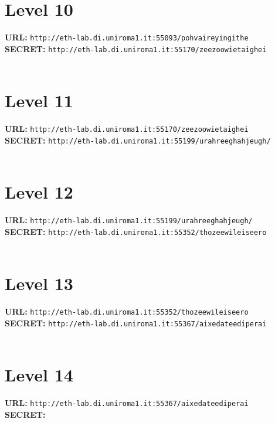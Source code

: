 \documentclass[12pt,a4paper]{article}
\begin{document}
	\section*{Level 10}
	\textbf{URL: }\texttt{http://eth-lab.di.uniroma1.it:55093/pohvaireyingithe}\\
	\textbf{SECRET: }\texttt{http://eth-lab.di.uniroma1.it:55170/zeezoowietaighei}\\\\


	\section*{Level 11}
	\textbf{URL: }\texttt{http://eth-lab.di.uniroma1.it:55170/zeezoowietaighei}\\
	\textbf{SECRET: }\texttt{http://eth-lab.di.uniroma1.it:55199/urahreeghahjeugh/}\\\\

	\section*{Level 12}
	\textbf{URL: }\texttt{http://eth-lab.di.uniroma1.it:55199/urahreeghahjeugh/}\\
	\textbf{SECRET: }\texttt{http://eth-lab.di.uniroma1.it:55352/thozeewileiseero}\\\\

	\section*{Level 13}
	\textbf{URL: }\texttt{http://eth-lab.di.uniroma1.it:55352/thozeewileiseero}\\
	\textbf{SECRET: }\texttt{http://eth-lab.di.uniroma1.it:55367/aixedateediperai}\\\\

	\section*{Level 14}
	\textbf{URL: }\texttt{http://eth-lab.di.uniroma1.it:55367/aixedateediperai}\\
	\textbf{SECRET: }\texttt{}\\\\
\end{document}
